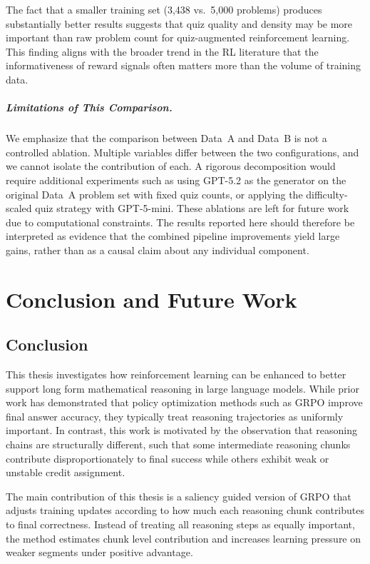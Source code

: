 \documentclass[12pt]{report}
\begin{document}
The fact that a smaller training set (3{,}438 vs.\ 5{,}000 problems) produces substantially better results suggests that quiz quality and density may be more important than raw problem count for quiz-augmented reinforcement learning. This finding aligns with the broader trend in the RL literature that the informativeness of reward signals often matters more than the volume of training data.

\paragraph{Limitations of This Comparison.}
We emphasize that the comparison between Data~A and Data~B is not a controlled ablation. Multiple variables differ between the two configurations, and we cannot isolate the contribution of each. A rigorous decomposition would require additional experiments such as using GPT-5.2 as the generator on the original Data~A problem set with fixed quiz counts, or applying the difficulty-scaled quiz strategy with GPT-5-mini. These ablations are left for future work due to computational constraints. The results reported here should therefore be interpreted as evidence that the combined pipeline improvements yield large gains, rather than as a causal claim about any individual component.


\chapter{Conclusion and Future Work}
\label{chap:conclusion}

\section{Conclusion}

This thesis investigates how reinforcement learning can be enhanced to better support long form mathematical reasoning in large language models. While prior work has demonstrated that policy optimization methods such as GRPO improve final answer accuracy, they typically treat reasoning trajectories as uniformly important. In contrast, this work is motivated by the observation that reasoning chains are structurally different, such that some intermediate reasoning chunks contribute disproportionately to final success while others exhibit weak or unstable credit assignment.

The main contribution of this thesis is a saliency guided version of GRPO that adjusts training updates according to how much each reasoning chunk contributes to final correctness. Instead of treating all reasoning steps as equally important, the method estimates chunk level contribution and increases learning pressure on weaker segments under positive advantage.
\end{document}
